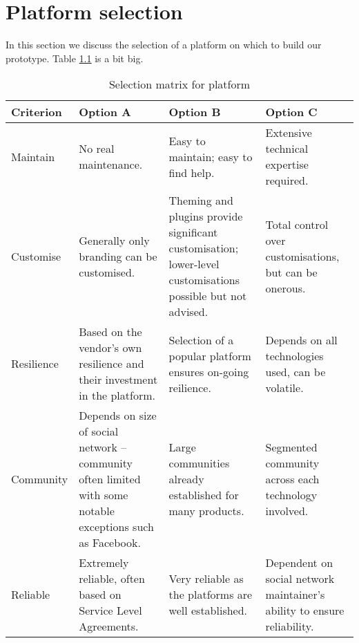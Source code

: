 
\chapter{Platform selection}
\label{chapter:platform}

In this section we discuss the selection of a platform on which to build our prototype.
Table \ref{table:selection} is a bit big.

\begin{table}[H]
  \centering
  {\footnotesize
  \begin{tabular}{p{}p{}p{}p{}}
    \toprule
      Criterion &
      Option A &
      Option B &
      Option C \\
    \midrule
      Maintain &
      No real maintenance. &
      Easy to maintain; easy to find help. &
      Extensive technical expertise required. \\
    \midrule
      Customise &
      Generally only branding can be customised. &
      Theming and plugins provide significant customisation; lower-level customisations possible but not advised. &
      Total control over customisations, but can be onerous. \\
    \midrule
      Resilience &
      Based on the vendor's own resilience and their investment in the platform. & 
      Selection of a popular platform ensures on-going reilience. &
      Depends on all technologies used, can be volatile. \\
    \midrule
      Community &
      Depends on size of social network -- community often limited with some notable exceptions such as Facebook. &
      Large communities already established for many products. &
      Segmented community across each technology involved. \\
    \midrule
      Reliable &
      Extremely reliable, often based on Service Level Agreements. &
      Very reliable as the platforms are well established. &
      Dependent on social network maintainer's ability to ensure reliability. \\
    \bottomrule
  \end{tabular}
  }
  \caption{Selection matrix for platform}
  \label{table:selection}
\end{table}